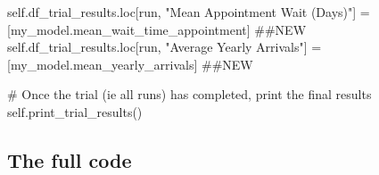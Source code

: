 \documentclass[
  letterpaper,
  DIV=11,
  numbers=noendperiod]{scrreprt}
\newenvironment{Shaded}{}{}
\newcommand{\CommentTok}[1]{\textcolor[rgb]{0.42,0.45,0.49}{#1}}
\newcommand{\NormalTok}[1]{\textcolor[rgb]{0.14,0.16,0.18}{#1}}
\newcommand{\OperatorTok}[1]{\textcolor[rgb]{0.14,0.16,0.18}{#1}}
\newcommand{\StringTok}[1]{\textcolor[rgb]{0.01,0.18,0.38}{#1}}
\newcommand{\VariableTok}[1]{\textcolor[rgb]{0.89,0.38,0.04}{#1}}
\begin{document}
\begin{Shaded}
\begin{Highlighting}[]
            \VariableTok{self}\NormalTok{.df\_trial\_results.loc[run, }\StringTok{"Mean Appointment Wait (Days)"}\NormalTok{] }\OperatorTok{=}\NormalTok{ [my\_model.mean\_wait\_time\_appointment] }\CommentTok{\#\#NEW}
            \VariableTok{self}\NormalTok{.df\_trial\_results.loc[run, }\StringTok{"Average Yearly Arrivals"}\NormalTok{] }\OperatorTok{=}\NormalTok{ [my\_model.mean\_yearly\_arrivals] }\CommentTok{\#\#NEW}


        \CommentTok{\# Once the trial (ie all runs) has completed, print the final results}
        \VariableTok{self}\NormalTok{.print\_trial\_results()}
\end{Highlighting}
\end{Shaded}

\subsection{The full code}\label{the-full-code-10}
\end{document}
